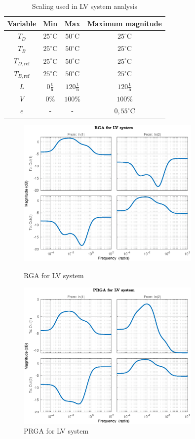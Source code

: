\documentclass[12pt]{article}
\begin{document}
\begin{table}[p]
\centering
\begin{tabular}{c | c | c | c}
Variable & Min & Max & Maximum magnitude \\ \hline
$T_D$ & $25^\circ$C & $50^\circ$C & $25^\circ$C \\
$T_B$ & $25^\circ$C & $50^\circ$C & $25^\circ$C \\
$T_{D, \textrm{ref}}$ & $25^\circ$C & $50^\circ$C & $25^\circ$C \\
$T_{B, \textrm{ref}}$ & $25^\circ$C & $50^\circ$C & $25^\circ$C \\
$L$ & $0 \frac{\textrm{t}}{\textrm{h}}$ & $120 \frac{\textrm{t}}{\textrm{h}}$ & $120 \frac{\textrm{t}}{\textrm{h}}$ \\
$V$ & $0\%$ & $100\%$ & $100\%$ \\
$e$ & - & - & $0,55^\circ$C
\end{tabular}
\caption{Scaling used in LV system analysis}
\label{tab:LV_scaling}
\end{table}

\begin{figure}[p]
\centering
\includegraphics[width=0.8\textwidth]{../Systemanalyse/Log_Data_to_Matlab/Figurer/LV_identifisering/LV_RGA.eps}
\caption{RGA for LV system}
\label{fig:LV_RGA}

\includegraphics[width=0.8\textwidth]{../Systemanalyse/Log_Data_to_Matlab/Figurer/LV_identifisering/LV_PRGA.eps}
\caption{PRGA for LV system}
\label{fig:LV_PRGA}
\end{figure}
\end{document}
